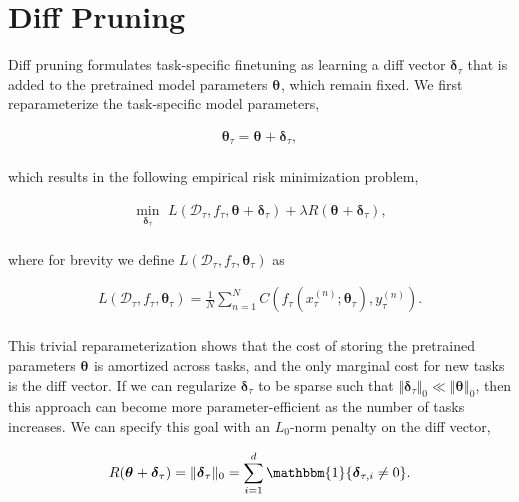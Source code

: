 \section{Diff Pruning}

 Diff pruning formulates task-specific finetuning as learning a diff vector $\boldsymbol{\delta}_\tau$ that is added to the pretrained model parameters $\boldsymbol{\theta}_\text{}$, which remain fixed. We first reparameterize the task-specific model parameters,

\begin{align*}
    \boldsymbol{\theta}_\tau = \boldsymbol{\theta}_\text{} + \boldsymbol{\delta}_\tau, \\[-6mm]
\end{align*}

which results in the following empirical risk minimization problem,

\begin{align*}
    \min_{\boldsymbol{\delta}_{\tau}}\,\,  L(\mathcal{D}_\tau, f_\tau, \boldsymbol{\theta}_\text{} + \boldsymbol{\delta}_\tau) + \lambda R( \boldsymbol{\theta}_\text{} + \boldsymbol{\delta}_\tau ),  \\[-6mm]
\end{align*}

 
where for brevity we define $L(\mathcal{D}_\tau, f_\tau, \boldsymbol{\theta}_\tau)$ as

\begin{align*}
L(\mathcal{D}_\tau, f_\tau, \boldsymbol{\theta}_\tau) =  \frac{1}{N} \sum_{n=1}^N C\left(f_\tau(x_\tau^{(n)}; \boldsymbol{\theta}_\tau), y_\tau^{(n)}\right).\\[-6mm]
\end{align*}

This trivial reparameterization shows that the cost of storing the pretrained parameters $\boldsymbol{\theta}_\text{}$ is amortized across tasks, and the only marginal cost for new tasks is the diff vector. If we can regularize $\boldsymbol{\delta}_\tau$ to be sparse such that $\Vert \boldsymbol{\delta}_\tau \Vert_0 \ll \Vert \boldsymbol{\theta}_\text{} \Vert_0 $, then this approach can become more parameter-efficient as the number of tasks increases. We can specify this goal with an $L_0$-norm penalty on the diff vector,

\begin{align*}
    R( \boldsymbol{\theta}_\text{} + \boldsymbol{\delta}_\tau ) = \Vert \boldsymbol{\delta}_\tau \Vert_0 = \sum_{i=1}^d \mathbbm{1}\{\boldsymbol{\delta}_{\tau, i} \ne 0\}.
\end{align*}


